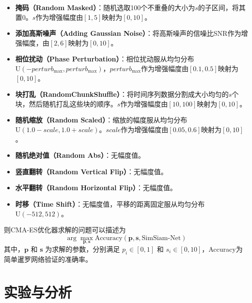 \documentclass[master]{thesis-uestc}
\begin{document}
\begin{itemize}
    \item \textbf{掩码（Random Masked）}：随机选取100个不重叠的大小为$s$的子区间，将其置0。$s$作为增强幅度由\([1,5]\)映射为\([0,10]\)。

    \item \textbf{添加高斯噪声（Adding Gaussian Noise）}：将高斯噪声的信噪比SNR作为增强幅度，由\([2,6]\)映射为\([0,10]\)。

    \item \textbf{相位扰动（Phase Perturbation）}：相位扰动服从均匀分布$\text{U}(-perturb_{\text{max}}, perturb_{\text{max}})$，$perturb_{\text{max}}$作为增强幅度由\([0.1,0.5]\)映射为\([0,10]\)。

    \item \textbf{块打乱（RandomChunkShuffle）}：将时间序列数据分割成大小均匀的$s$个块，然后随机打乱这些块的顺序。$s$作为增强幅度由\([10,100]\)映射为\([0,10]\)。

    \item \textbf{随机缩放（Random Scaled）}：缩放的幅度服从均匀分布$\text{U}(1.0-scale, 1.0+scale)$。$scale$作为增强幅度由\([0.05,0.6]\)映射为\([0,10]\)。

    \item \textbf{随机绝对值（Random Abs）}：无幅度值。

    \item \textbf{竖直翻转（Random Vertical Flip）}：无幅度值。

    \item \textbf{水平翻转（Random Horizontal Flip）}：无幅度值。

    \item \textbf{时移（Time Shift）}：无幅度值，平移的距离固定服从均匀分布$\text{U}(-512, 512)$。
\end{itemize}
则CMA-ES优化器求解的问题可以描述为 
\begin{equation}
    \arg\max_{\mathbf{p}, \mathbf{s}} \text{Accuracy}(\mathbf{p}, \mathbf{s}, \text{SimSiam-Net})
\end{equation}
其中，\(\mathbf{p}\) 和 \(\mathbf{s}\) 为求解的参数，分别满足 \(p_i \in [0, 1]\) 和 \(s_i \in [0, 10]\)，Accuracy为简单暹罗网络验证的准确率。

\section{实验与分析}
\end{document}
